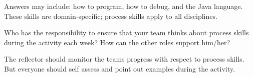 \begin{answer}[5em]
Answers may include: how to program, how to debug, and the Java language.
These skills are domain-specific; process skills apply to all disciplines.
\end{answer}


\Q Who has the responsibility to ensure that your team thinks about process skills during the activity each week?
How can the other roles support him/her?

\begin{answer}
The reflector should monitor the teams progress with respect to process skills.
But everyone should self assess and point out examples during the activity.
\end{answer}
